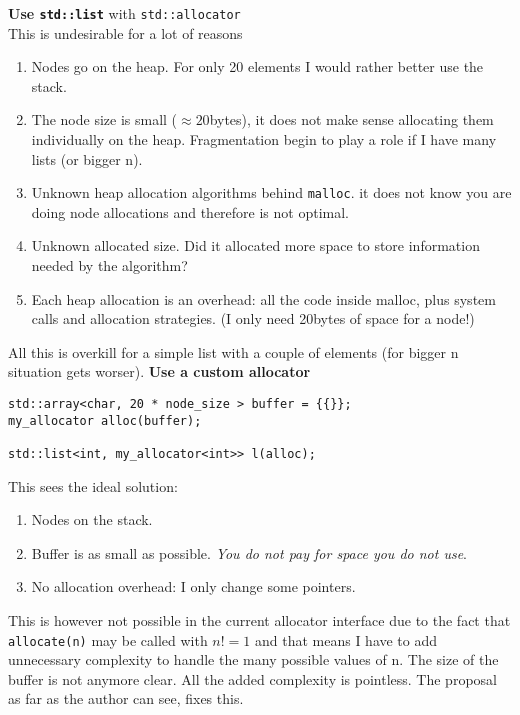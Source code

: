 \documentclass[11pt]{article}
\begin{document}
\medskip
\noindent
{\bf Use \texttt{std::list}} with \texttt{std::allocator} \\
This is undesirable for a lot of reasons
\begin{enumerate}
\item Nodes go on the heap. For only 20 elements I would rather better
use the stack.
\item The node size is small ($\approx 20$bytes), it does not make sense allocating
them individually on the heap. Fragmentation begin to play a role
if I have many lists (or bigger n).
\item Unknown heap allocation algorithms behind \texttt{malloc}. it does not
know you are doing node allocations and therefore is not optimal.
\item Unknown allocated size. Did it allocated more space to store information
needed by the algorithm?
\item  Each heap allocation is an overhead: all the code inside malloc, plus
system calls and allocation strategies. (I only need 20bytes of space for a
node!)
\end{enumerate}

All this is overkill for a simple list with a couple of elements
(for bigger n situation gets worser).
\medskip
\noindent
{\bf Use a custom allocator} \\

\medskip
\begin{lstlisting}
std::array<char, 20 * node_size > buffer = {{}};
my_allocator alloc(buffer);

std::list<int, my_allocator<int>> l(alloc);
\end{lstlisting}

This sees the ideal solution:
\begin{enumerate}
\item Nodes on the stack.
\item Buffer is as small as possible. {\it You do not pay for space
you do not use}.
\item No allocation overhead: I only change some pointers.
\end{enumerate}

This is however not possible in the current allocator interface
due to the fact that \texttt{allocate(n)} may be called with $n != 1$ and
that means I have to add unnecessary complexity to handle the many possible
values of n. The size of the buffer is not anymore clear. All the added
complexity is pointless. The proposal as far as the author can see, fixes this.
\end{document}
